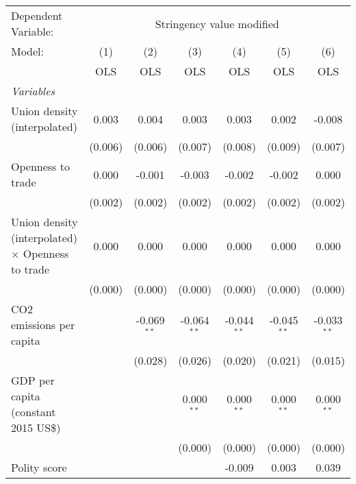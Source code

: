 
\begingroup
\centering
\begin{tabular}{lcccccc}
   \toprule
   Dependent Variable: & \multicolumn{6}{c}{Stringency value modified}\\
   Model:                                                   & (1)     & (2)           & (3)           & (4)           & (5)           & (6)\\  
                                                            &  OLS    & OLS           & OLS           & OLS           & OLS           & OLS\\  
   \midrule
   \emph{Variables}\\
   Union density (interpolated)                             & 0.003   & 0.004         & 0.003         & 0.003         & 0.002         & -0.008\\   
                                                            & (0.006) & (0.006)       & (0.007)       & (0.008)       & (0.009)       & (0.007)\\   
   Openness to trade                                        & 0.000   & -0.001        & -0.003        & -0.002        & -0.002        & 0.000\\   
                                                            & (0.002) & (0.002)       & (0.002)       & (0.002)       & (0.002)       & (0.002)\\   
   Union density (interpolated) $\times$ Openness to trade  & 0.000   & 0.000         & 0.000         & 0.000         & 0.000         & 0.000\\   
                                                            & (0.000) & (0.000)       & (0.000)       & (0.000)       & (0.000)       & (0.000)\\   
   CO2 emissions per capita                                 &         & -0.069$^{**}$ & -0.064$^{**}$ & -0.044$^{**}$ & -0.045$^{**}$ & -0.033$^{**}$\\   
                                                            &         & (0.028)       & (0.026)       & (0.020)       & (0.021)       & (0.015)\\   
   GDP per capita (constant 2015 US\$)                      &         &               & 0.000$^{**}$  & 0.000$^{**}$  & 0.000$^{**}$  & 0.000$^{**}$\\   
                                                            &         &               & (0.000)       & (0.000)       & (0.000)       & (0.000)\\   
   Polity score                                             &         &               &               & -0.009        & 0.003         & 0.039\\   

\end{tabular}
